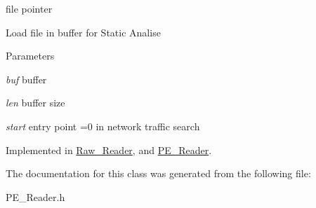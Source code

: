 file pointer 

Load file in buffer for Static Analise 
\begin{DoxyParams}{Parameters}
\item[{\em buf}]buffer \item[{\em len}]buffer size \item[{\em start}]entry point =0 in network traffic search \end{DoxyParams}


Implemented in \hyperlink{classRaw__Reader_a135e1dd4eadb2afaf201002d5402f21e}{Raw\_\-Reader}, and \hyperlink{classPE__Reader_a4b5e1c738c887247181c4e3d0f253c27}{PE\_\-Reader}.



The documentation for this class was generated from the following file:\begin{DoxyCompactItemize}
\item 
PE\_\-Reader.h\end{DoxyCompactItemize}
